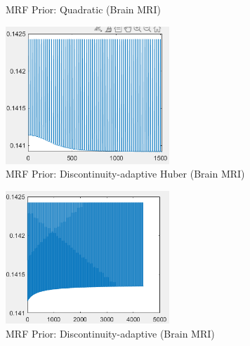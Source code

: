 \documentclass[12pt]{article}
\theoremstyle{definition}
\numberwithin{thm}{section}
\begin{document}
\begin{enumerate}[label=(\alph*)]
\begin{figure}[H]
    	\caption{MRF Prior: Quadratic (Brain MRI)}
    	\label{fig:Q2G}
	\end{figure}
	\begin{figure}[H]
		\centering
    	\includegraphics[width=0.55\textwidth]{imgs/DAH_BrainMRI_RRMSE.png}
    	\caption{MRF Prior: Discontinuity-adaptive Huber (Brain MRI)}
    	\label{fig:DAH2G}
	\end{figure}
	\begin{figure}[H]
		\centering
    	\includegraphics[width=0.55\textwidth]{imgs/DA_BrainMRI_RRMSE.png}
    	\caption{MRF Prior: Discontinuity-adaptive (Brain MRI)}
    	\label{fig:DA2G}
	\end{figure}
\end{enumerate}
\newpage
\end{document}
